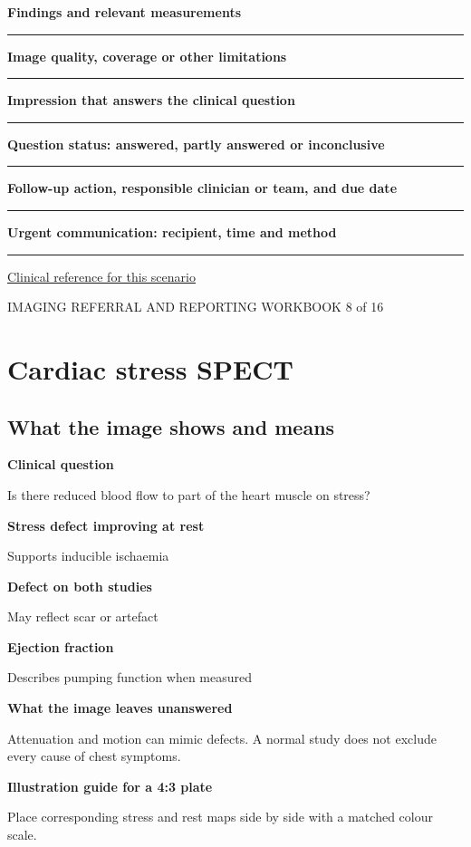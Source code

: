 \documentclass[11pt,a4paper]{article}
\newcommand{\record}[1]{\textbf{#1}\par\vspace{0.55\baselineskip}\hrule\vspace{0.35\baselineskip}}
\begin{document}
\record{Findings and relevant measurements}

\record{Image quality, coverage or other limitations}

\record{Impression that answers the clinical question}

\record{Question status: answered, partly answered or inconclusive}

\record{Follow-up action, responsible clinician or team, and due date}

\record{Urgent communication: recipient, time and method}

\small\href{https://www.jacc.org/doi/10.1016/j.jacc.2021.07.053}{Clinical reference for this scenario}

\normalsize

\newpage

{\small IMAGING REFERRAL AND REPORTING WORKBOOK \hfill 8 of 16}

\section*{Cardiac stress SPECT}

\subsection*{What the image shows and means}

\textbf{Clinical question}\par Is there reduced blood flow to part of the heart muscle on stress?\par

\textbf{Stress defect improving at rest}\par Supports inducible ischaemia\par

\textbf{Defect on both studies}\par May reflect scar or artefact\par

\textbf{Ejection fraction}\par Describes pumping function when measured\par

\textbf{What the image leaves unanswered}\par Attenuation and motion can mimic defects. A normal study does not exclude every cause of chest symptoms.\par

\textbf{Illustration guide for a 4:3 plate}\par Place corresponding stress and rest maps side by side with a matched colour scale.\par
\end{document}

